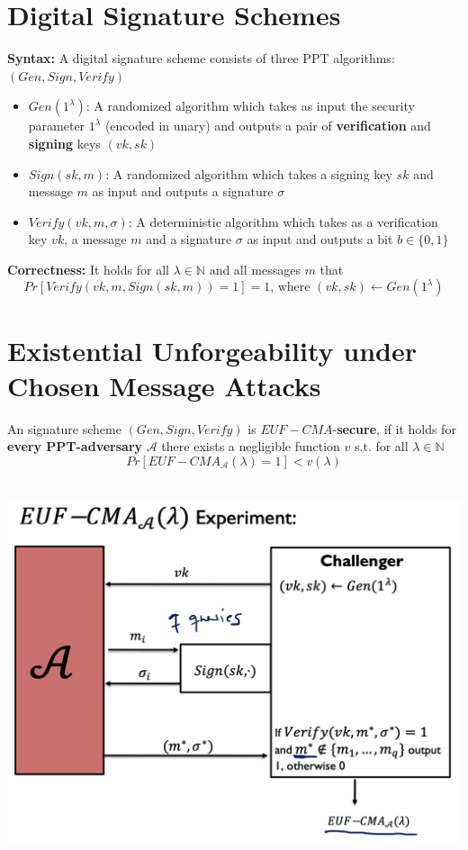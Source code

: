 \section{Digital Signature Schemes}
    \textbf{Syntax:} A digital signature scheme consists of three PPT algorithms: $(Gen,Sign,Verify)$
    \begin{itemize}
        \item $Gen(1^{\lambda})$: A randomized algorithm which takes as input the security parameter $1^{\lambda}$ (encoded in unary) 
        and outputs a pair of \textbf{verification} and \textbf{signing} keys $(vk,sk)$
        \item $Sign(sk,m)$: A randomized algorithm which takes a signing key $sk$ and message $m$ as input and outputs a signature $\sigma$
        \item $Verify(vk,m,\sigma)$: A deterministic algorithm which takes as a verification key $vk$, 
        a message $m$ and a signature $\sigma$ as input and outputs a bit $b \in \{0,1\}$
    \end{itemize}
    \textbf{Correctness:} It holds for all $\lambda \in \mathbb{N}$ and all messages $m$ that
    $$Pr[Verify(vk,m,Sign(sk,m))=1] = 1 \text{, where } (vk,sk) \leftarrow Gen(1^{\lambda})$$

\section{Existential Unforgeability under Chosen Message Attacks}
    \begin{definition}
        An signature scheme $(Gen,Sign,Verify)$ is $EUF-CMA$-\textbf{secure}, if it holds for \textbf{every PPT-adversary} $\mathcal{A}$ there exists a negligible function $v$ s.t. for all $\lambda \in \mathbb{N}$
        $$Pr[EUF-CMA_{\mathcal{A}}(\lambda)=1] < v(\lambda)$$\\
    \end{definition}
    \begin{center}
	    \includegraphics[width=160mm]{Graphics/Digital Signatures/ds3.png}
    \end{center}

